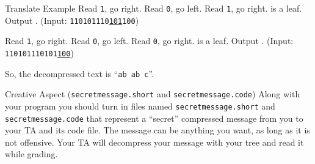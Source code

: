 \documentclass[programming]{../../mfcs}
\begin{document}
\begin{question}{Translate Example}
Read \texttt{1}, go right.  Read \texttt{0}, go left.  Read \texttt{1}, go right.  \qquote{ } is a leaf.  Output \qquote{ }.
\hfill (Input: \texttt{110101110\underline{101}100})

Read \texttt{1}, go right.  Read \texttt{0}, go left.  Read \texttt{0}, go right.   is a leaf.  Output .
\hfill (Input: \texttt{110101110101\underline{100}})

\vspace{1em}

So, the decompressed text is ``\texttt{ab ab c}''.

\end{question}

\begin{question}{Creative Aspect (\texttt{secretmessage.short} and \texttt{secretmessage.code})}
Along with your program you should turn in files named \texttt{secretmessage.short} and
\texttt{secretmessage.code} that represent a ``secret'' compressed message from you to your
TA and its code file. The message can be anything you want, as long as it is not offensive.
Your TA will decompress your message with your tree and read it while grading.
\end{question}


\newpage
\end{document}
